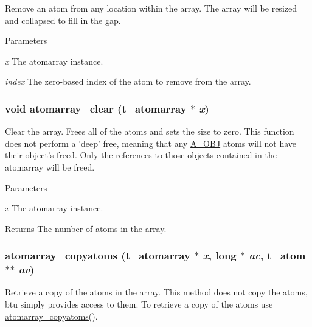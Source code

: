 Remove an atom from any location within the array. The array will be resized and collapsed to fill in the gap.


\begin{DoxyParams}{Parameters}
\item[{\em x}]The atomarray instance. \item[{\em index}]The zero-\/based index of the atom to remove from the array. \end{DoxyParams}
\hypertarget{group__atomarray_ga185b275ee3d94fa9a21d3ca6ece43c33}{
\subsubsection[{atomarray\_\-clear}]{\setlength{\rightskip}{0pt plus 5cm}void atomarray\_\-clear ({\bf t\_\-atomarray} $\ast$ {\em x})}}
\label{group__atomarray_ga185b275ee3d94fa9a21d3ca6ece43c33}


Clear the array. Frees all of the atoms and sets the size to zero. This function does not perform a 'deep' free, meaning that any \hyperlink{group__atom_gga8aa6700e9f00b132eb376db6e39ade47a82cc76e0d53c8fc28df167c35d5bbd1a}{A\_\-OBJ} atoms will not have their object's freed. Only the references to those objects contained in the atomarray will be freed.


\begin{DoxyParams}{Parameters}
\item[{\em x}]The atomarray instance. \end{DoxyParams}
\begin{DoxyReturn}{Returns}
The number of atoms in the array. 
\end{DoxyReturn}
\hypertarget{group__atomarray_gaec25ec428f6bb7b1a1c8092b5c01f2c2}{
\subsubsection[{atomarray\_\-copyatoms}]{ atomarray\_\-copyatoms ({\bf t\_\-atomarray} $\ast$ {\em x}, \/  long $\ast$ {\em ac}, \/  {\bf t\_\-atom} $\ast$$\ast$ {\em av})}}
\label{group__atomarray_gaec25ec428f6bb7b1a1c8092b5c01f2c2}


Retrieve a copy of the atoms in the array. This method does not copy the atoms, btu simply provides access to them. To retrieve a copy of the atoms use \hyperlink{group__atomarray_gaec25ec428f6bb7b1a1c8092b5c01f2c2}{atomarray\_\-copyatoms()}.


